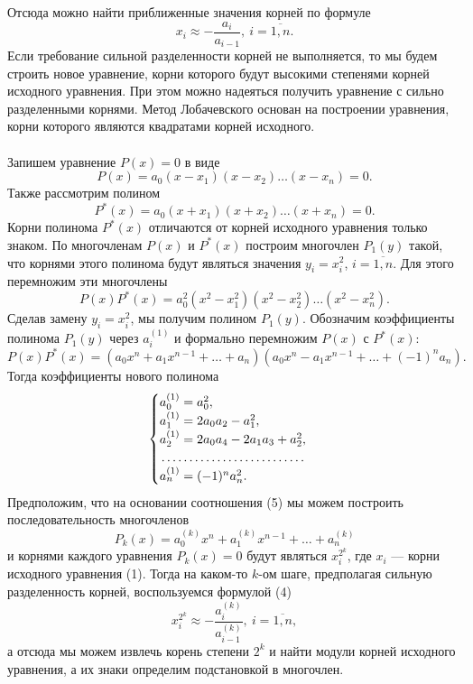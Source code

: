 \documentclass[a4paper, 12pt]{report}
\numberwithin{equation}{section}
\begin{document}
Отсюда можно найти приближенные значения корней по формуле
\begin{equation}
	x_i \approx -\dfrac{a_i}{a_{i-1}},\ i=\overline{1,n}.
\end{equation}
Если требование сильной разделенности корней не выполняется, то мы будем строить новое уравнение, корни которого будут высокими степенями корней исходного уравнения. При этом можно надеяться получить уравнение с сильно разделенными корнями. Метод Лобачевского основан на построении уравнения, корни которого являются квадратами корней исходного.\\\\
Запишем уравнение $P(x) =0$ в виде $$P(x) = a_0(x-x_1)(x-x_2)\ldots(x-x_n) =0.$$
Также рассмотрим полином $$P^*(x) = a_0(x+x_1)(x+x_2)\ldots (x+x_n)=0.$$
Корни полинома $P^*(x)$ отличаются от корней исходного уравнения только знаком. По многочленам $P(x)$ и $P^*(x)$ построим многочлен $P_1(y)$ такой, что корнями этого полинома будут являться значения $y_i = x_i^2$, $i=\overline{1,n}.$ Для этого перемножим эти многочлены $$P(x)P^*(x) = a_0^2(x^2 - x_1^2)(x^2 - x_2^2)\ldots(x^2 - x_n^2).$$
Сделав замену $y_i = x_i^2$, мы получим полином $P_1(y)$. Обозначим коэффициенты полинома $P_1(y)$ через $a_i^{(1)}$ и формально перемножим $P(x)$ с $P^*(x)$:
$$P(x)P^*(x) = (a_0x^n + a_{1}x^{n-1} + \ldots + a_n)(a_0x^n - a_1x^{n-1} +\ldots + (-1)^na_n).$$
Тогда коэффициенты нового полинома 
\begin{equation}
	\begin{cases}
		a_0^{(1)} = a_0^2,\\
		a_1^{(1)} =2a_0a_2 - a_1^2,\\
		a_2^{(1)} = 2a_0a_4 - 2a_1a_3 + a_2^2,\\
		\dotfill\\
		a_n^{(1)} = (-1)^na_n^2.
	\end{cases}
\end{equation}
Предположим, что на основании соотношения (5) мы можем построить последовательность многочленов $$P_k(x) = a_0^{(k)}x^n + a_1^{(k)}x^{n-1} + \ldots + a_n^{(k)}$$ и корнями каждого уравнения $P_k(x) = 0$ будут являться $x_i^{2^k}$, где $x_i$ --- корни исходного уравнения (1). Тогда на каком-то $k$-ом шаге, предполагая сильную разделенность корней, воспользуемся формулой (4) $$x_i^{2^k}\approx - \dfrac{a_i^{(k)}}{a_{i-1}^{(k)}},\ i =\overline{1,n},$$
а отсюда мы можем извлечь корень степени $2^k$ и найти модули корней исходного уравнения, а их знаки определим подстановкой в многочлен.\\\\
\end{document}
